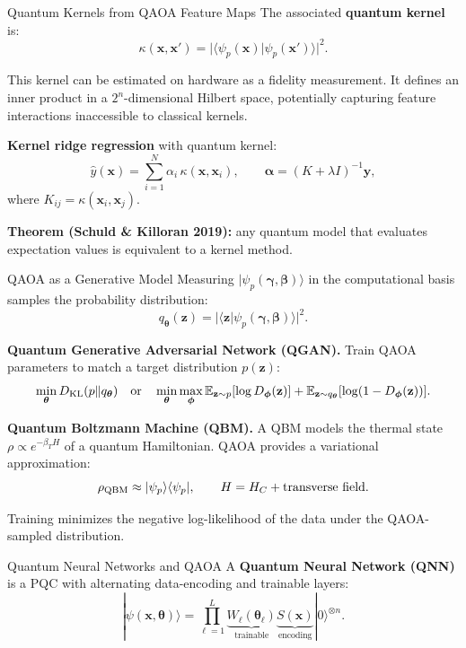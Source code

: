 \documentclass{beamer}
\begin{document}
\begin{frame}
\begin{frame}{Quantum Kernels from QAOA Feature Maps}
The associated \textbf{quantum kernel} is:
\[
\kappa(\mathbf{x},\mathbf{x}')
= \bigl|\langle\psi_p(\mathbf{x})|\psi_p(\mathbf{x}')\rangle\bigr|^2.
\]

This kernel can be estimated on hardware as a fidelity measurement.
It defines an inner product in a $2^n$-dimensional Hilbert space,
potentially capturing feature interactions inaccessible to classical kernels.

\medskip

\textbf{Kernel ridge regression} with quantum kernel:
\[
\hat{y}(\mathbf{x}) = \sum_{i=1}^N \alpha_i\,\kappa(\mathbf{x},\mathbf{x}_i),
\qquad
\boldsymbol{\alpha} = (K + \lambda I)^{-1}\mathbf{y},
\]
where $K_{ij} = \kappa(\mathbf{x}_i,\mathbf{x}_j)$.

\textbf{Theorem (Schuld \& Killoran 2019):} any quantum model that
evaluates expectation values is equivalent to a kernel method.
\end{frame}


\begin{frame}{QAOA as a Generative Model}
Measuring $|\psi_p(\boldsymbol{\gamma},\boldsymbol{\beta})\rangle$ in
the computational basis samples the probability distribution:
\[
q_{\boldsymbol{\theta}}(\mathbf{z})
= |\langle\mathbf{z}|\psi_p(\boldsymbol{\gamma},\boldsymbol{\beta})\rangle|^2.
\]

\textbf{Quantum Generative Adversarial Network (QGAN).}
Train QAOA parameters to match a target distribution $p(\mathbf{z})$:
\[
\min_{\boldsymbol{\theta}}
D_{\rm KL}(p \| q_{\boldsymbol{\theta}})
\quad\text{or}\quad
\min_{\boldsymbol{\theta}}\max_{\boldsymbol{\phi}}
\mathbb{E}_{\mathbf{z}\sim p}[\log D_{\boldsymbol{\phi}}(\mathbf{z})]
+ \mathbb{E}_{\mathbf{z}\sim q_{\boldsymbol{\theta}}}[\log(1-D_{\boldsymbol{\phi}}(\mathbf{z}))].
\]

\textbf{Quantum Boltzmann Machine (QBM).}
A QBM models the thermal state $\rho \propto e^{-\beta_T H}$ of a
quantum Hamiltonian. QAOA provides a variational approximation:
\[
\rho_{\rm QBM} \approx |\psi_p\rangle\langle\psi_p|,
\qquad
H = H_C + \text{transverse field}.
\]

Training minimizes the negative log-likelihood of the data under
the QAOA-sampled distribution.
\end{frame}


\begin{frame}{Quantum Neural Networks and QAOA}
A \textbf{Quantum Neural Network (QNN)} is a PQC with
alternating data-encoding and trainable layers:
\[
|\psi(\mathbf{x},\boldsymbol{\theta})\rangle
= \prod_{\ell=1}^L
\underbrace{W_\ell(\boldsymbol{\theta}_\ell)}_{\text{trainable}}
\underbrace{S(\mathbf{x})}_{\text{encoding}}
|0\rangle^{\otimes n}.
\]


\end{frame}
\end{frame}
\end{document}
